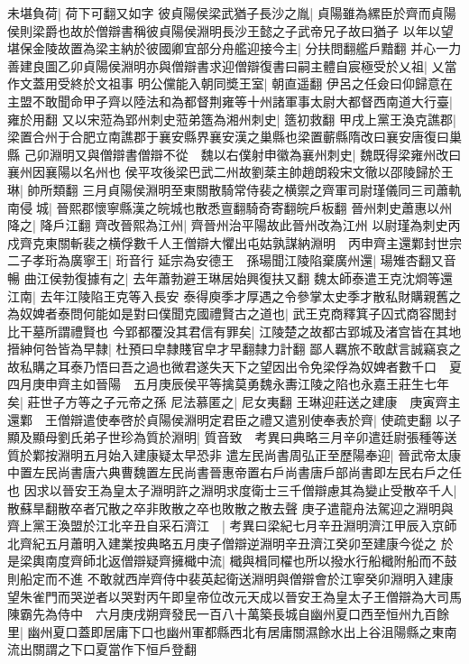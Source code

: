未堪負荷|{
	荷下可翻又如字}
彼貞陽侯梁武猶子長沙之胤|{
	貞陽雖為縲臣於齊而貞陽侯則梁爵也故於僧辯書稱彼貞陽侯淵明長沙王懿之子武帝兄子故曰猶子}
以年以望堪保金陵故置為梁主納於彼國卿宜部分舟艦迎接今主|{
	分扶問翻艦戶黯翻}
并心一力善建良圖乙卯貞陽侯淵明亦與僧辯書求迎僧辯復書曰嗣主體自宸極受於乂祖|{
	乂當作文蓋用受終於文祖事}
明公儻能入朝同奬王室|{
	朝直遥翻}
伊呂之任僉曰仰歸意在主盟不敢聞命甲子齊以陸法和為都督荆雍等十州諸軍事太尉大都督西南道大行臺|{
	雍於用翻}
又以宋蒞為郢州刺史蒞弟簉為湘州刺史|{
	簉初救翻}
甲戌上黨王渙克譙郡|{
	梁置合州于合肥立南譙郡于襄安縣界襄安漢之巢縣也梁置蘄縣隋改曰襄安唐復曰巢縣}
己卯淵明又與僧辯書僧辯不從　魏以右僕射申徽為襄州刺史|{
	魏既得梁雍州改曰襄州因襄陽以名州也}
侯平攻後梁巴武二州故劉棻主帥趙朗殺宋文徹以邵陵歸於王琳|{
	帥所類翻}
三月貞陽侯淵明至東關散騎常侍裴之横禦之齊軍司尉瑾儀同三司蕭軌南侵城|{
	晉熙郡懷寧縣漢之皖城也散悉亶翻騎奇寄翻皖戶板翻}
晉州刺史蕭惠以州降之|{
	降戶江翻}
齊改晉熙為江州|{
	齊晉州治平陽故此晉州改為江州}
以尉瑾為刺史丙戍齊克東關斬裴之横俘數千人王僧辯大懼出屯姑孰謀納淵明　丙申齊主還鄴封世宗二子孝珩為廣寧王|{
	珩音行}
延宗為安德王　孫瑒聞江陵陷棄廣州還|{
	瑒雉杏翻又音暢}
曲江侯勃復據有之|{
	去年蕭勃避王琳居始興復扶又翻}
魏太師泰遣王克沈烱等還江南|{
	去年江陵陷王克等入長安}
泰得庾季才厚遇之令參掌太史季才散私財購親舊之為奴婢者泰問何能如是對曰僕聞克國禮賢古之道也|{
	武王克商釋箕子囚式商容閭封比干墓所謂禮賢也}
今郢都覆没其君信有罪矣|{
	江陵楚之故都古郢城及渚宫皆在其地}
搢紳何咎皆為早隸|{
	杜預曰皁隸賤官皁才早翻隸力計翻}
鄙人羈旅不敢獻言誠竊哀之故私購之耳泰乃悟曰吾之過也微君遂失天下之望因出令免梁俘為奴婢者數千口　夏四月庚申齊主如晉陽　五月庚辰侯平等擒莫勇魏永夀江陵之陷也永嘉王莊生七年矣|{
	莊世子方等之子元帝之孫}
尼法慕匿之|{
	尼女夷翻}
王琳迎莊送之建康　庚寅齊主還鄴　王僧辯遣使奉啓於貞陽侯淵明定君臣之禮又遣别使奉表於齊|{
	使疏吏翻}
以子顯及顯母劉氏弟子世珍為質於淵明|{
	質音致　考異曰典略三月辛卯遣廷尉張種等送質於鄴按淵明五月始入建康疑太早恐非}
遣左民尚書周弘正至歷陽奉迎|{
	晉武帝太康中置左民尚書唐六典曹魏置左民尚書晉惠帝置右戶尚書唐戶部尚書即左民右戶之任也}
因求以晉安王為皇太子淵明許之淵明求度衛士三千僧辯慮其為變止受散卒千人|{
	散蘇旱翻散卒者冗散之卒非敗散之卒也敗散之散去聲}
庚子遣龍舟法駕迎之淵明與齊上黨王渙盟於江北辛丑自采石濟江　|{
	考異曰梁紀七月辛丑淵明濟江甲辰入京師北齊紀五月蕭明入建業按典略五月庚子僧辯逆淵明辛丑濟江癸卯至建康今從之}
於是梁輿南度齊師北返僧辯疑齊擁檝中流|{
	檝與楫同櫂也所以撥水行船檝附船而不鼓則船定而不進}
不敢就西岸齊侍中裴英起衛送淵明與僧辯會於江寧癸卯淵明入建康望朱雀門而哭逆者以哭對丙午即皇帝位改元天成以晉安王為皇太子王僧辯為大司馬陳霸先為侍中　六月庚戌朔齊發民一百八十萬築長城自幽州夏口西至恒州九百餘里|{
	幽州夏口蓋即居庸下口也幽州軍都縣西北有居庸關濕餘水出上谷沮陽縣之東南流出關謂之下口夏當作下恒戶登翻}
